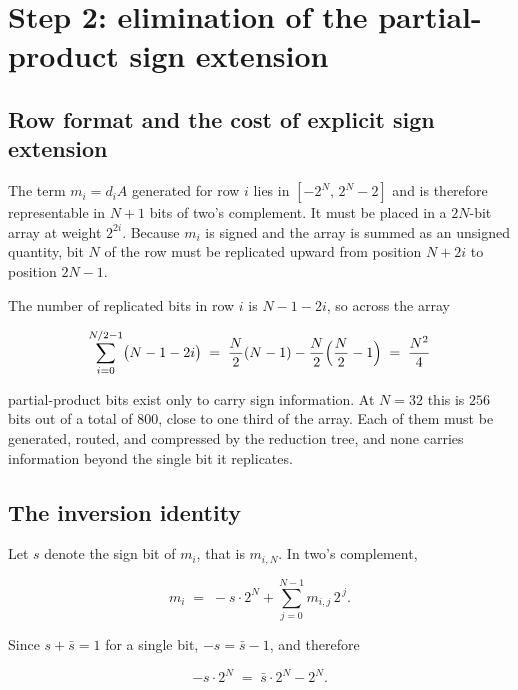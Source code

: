 \documentclass[11pt,a4paper]{article}
\begin{document}
\section{Step 2: elimination of the partial-product sign extension}
\label{sec:opt1}

\subsection{Row format and the cost of explicit sign extension}

The term $m_i = d_i A$ generated for row $i$ lies in $[-2^N,\,2^N-2]$ and is
therefore representable in $N+1$ bits of two's complement. It must be placed in
a $2N$-bit array at weight $2^{2i}$. Because $m_i$ is signed and the array is
summed as an unsigned quantity, bit $N$ of the row must be replicated upward
from position $N+2i$ to position $2N-1$.

The number of replicated bits in row $i$ is $N-1-2i$, so across the array

\begin{equation}
\sum_{i=0}^{N/2-1} \bigl(N-1-2i\bigr)
\;=\; \frac{N}{2}(N-1) - \frac{N}{2}\Bigl(\frac{N}{2}-1\Bigr)
\;=\; \frac{N^2}{4}
\label{eq:secost}
\end{equation}

partial-product bits exist only to carry sign information. At $N=32$ this is
$256$ bits out of a total of $800$, close to one third of the array. Each of
them must be generated, routed, and compressed by the reduction tree, and none
carries information beyond the single bit it replicates.

\subsection{The inversion identity}

Let $s$ denote the sign bit of $m_i$, that is $m_{i,N}$. In two's complement,

\begin{equation}
m_i \;=\; -s\cdot 2^N + \sum_{j=0}^{N-1} m_{i,j}\,2^{\,j}.
\end{equation}

Since $s + \bar{s} = 1$ for a single bit, $-s = \bar{s} - 1$, and therefore

\begin{equation}
-s\cdot 2^N \;=\; \bar{s}\cdot 2^N - 2^N.
\label{eq:identity}
\end{equation}
\end{document}
